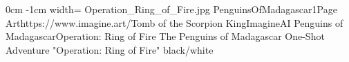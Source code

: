 \documentclass[letterpaper,openany,twoside,twocolumn]{book}
\begin{document}
	\DungeonSheetGeometry
		{0cm}%
		{-1cm}%
		{width=\paperwidth}%
		{Operation_Ring_of_Fire.jpg}%
		{%
			{PenguinsOfMadagascar1}{Page \thepage}{Art}{https://www.imagine.art/}{Tomb of the Scorpion King}{ImagineAI}%
		}%
		{{}{Penguins of Madagascar}{}{Operation: Ring of Fire}}%
		{{}{The Penguins of Madagascar One-Shot Adventure "Operation: Ring of Fire"}}%
		{black/white}%
	\clearpage
	\tableofcontents
	
\end{document}
